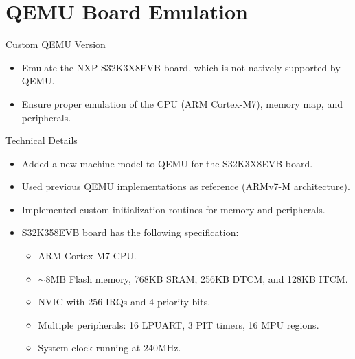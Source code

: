 
\section{QEMU Board Emulation}

\begin{frame}{Custom QEMU Version}
    \begin{itemize}
        \item Emulate the NXP S32K3X8EVB board, which is not natively supported by QEMU.
        \item Ensure proper emulation of the CPU (ARM Cortex-M7), memory map, and peripherals.
    \end{itemize}
\end{frame}

\begin{frame}{Technical Details}
    \begin{itemize}
        \item Added a new machine model to QEMU for the S32K3X8EVB board.
        \item Used previous QEMU implementations as reference (ARMv7-M architecture).
        \item Implemented custom initialization routines for memory and peripherals.
        \item S32K358EVB board has the following specification:
            \begin{itemize}
                \item ARM Cortex-M7 CPU.
                \item \(\sim \)8MB Flash memory, 768KB SRAM, 256KB DTCM, and 128KB ITCM.
                \item NVIC with 256 IRQs and 4 priority bits.
                \item Multiple peripherals: 16 LPUART, 3 PIT timers, 16 MPU regions.
                \item System clock running at 240MHz.
            \end{itemize}
    \end{itemize}
\end{frame}

